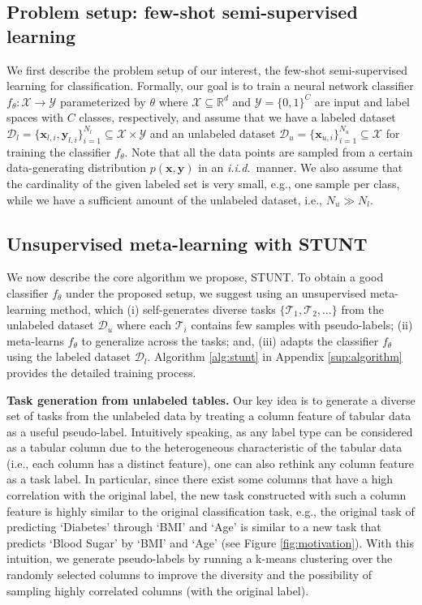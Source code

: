\subsection{Problem setup: few-shot semi-supervised learning}
\label{sec:problem_setup}

We first describe the problem setup of our interest, the few-shot semi-supervised learning for classification. Formally, our goal is to train a neural network classifier $f_\theta:\mathcal{X}\rightarrow \mathcal{Y}$ parameterized by $\theta$ where $\mathcal{X}\subseteq\mathbb{R}^d$ and $\mathcal{Y}=\{0,1\}^C$ are input and label spaces with $C$ classes, respectively, and assume that we have a labeled dataset $\mathcal{D}_l=\{{\mathbf{x}}_{l,i}, {\mathbf{y}}_{l,i}\}_{i=1}^{N_l}\subseteq\mathcal{X}\times\mathcal{Y}$ and an unlabeled dataset $\mathcal{D}_u=\{{\mathbf{x}}_{u,i}\}_{i=1}^{N_u}\subseteq\mathcal{X}$ for training the classifier $f_\theta$. Note that  all the data points are sampled from a certain data-generating distribution $p({\mathbf{x}},{\mathbf{y}})$ in an \textit{i.i.d.}\ manner. We also assume that the cardinality of the given labeled set is very small, e.g., one sample per class, while we have a sufficient amount of the unlabeled dataset, i.e., $N_u \gg N_l$. 

\subsection{Unsupervised meta-learning with STUNT}
\label{sec:unsup_meta}

We now describe the core algorithm we propose, STUNT. To obtain a good classifier $f_\theta$ under the proposed setup, we suggest using an unsupervised meta-learning method, which (i) self-generates diverse tasks $\{\mathcal{T}_1,\mathcal{T}_2,\ldots\}$ from the unlabeled dataset $\mathcal{D}_u$
where each $\mathcal{T}_i$ contains few samples with pseudo-labels; (ii) meta-learns $f_\theta$ to generalize across the tasks; and, (iii) adapts the classifier $f_\theta$ using the labeled dataset $\mathcal{D}_l$. 
Algorithm \ref{alg:stunt} in Appendix \ref{sup:algorithm} provides the detailed training process.

\textbf{Task generation from unlabeled tables.} Our key idea is to generate a diverse set of tasks from the unlabeled data by treating a column feature of tabular data as a useful pseudo-label. Intuitively speaking, as any label type can be considered as a tabular column due to the heterogeneous characteristic of the tabular data (i.e., each column has a distinct feature), one can also rethink any column feature as a task label. In particular, since there exist some columns that have a high correlation with the original label, the new task constructed with such a column feature is highly similar to the original classification task, e.g., the original task of predicting `Diabetes' through `BMI' and `Age' is similar to a new task that predicts `Blood Sugar' by `BMI' and `Age' (see Figure \ref{fig:motivation}). With this intuition, we generate pseudo-labels by running a k-means clustering over the randomly selected columns to improve the diversity and the possibility of sampling highly correlated columns (with the original label).

